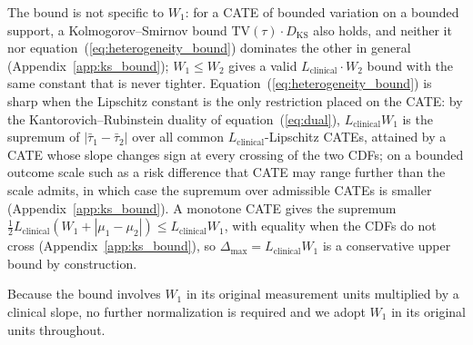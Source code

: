 \documentclass[AMA,Times1COL]{WileyNJDv5}
\begin{document}
The bound is not specific to $W_1$: for a CATE of bounded variation on a bounded support, a Kolmogorov--Smirnov bound $\mathrm{TV}(\tau) \cdot D_{\text{KS}}$ also holds, and neither it nor equation~(\ref{eq:heterogeneity_bound}) dominates the other in general (Appendix~\ref{app:ks_bound}); $W_1 \leq W_2$ gives a valid $L_{\text{clinical}} \cdot W_2$ bound with the same constant that is never tighter. Equation~(\ref{eq:heterogeneity_bound}) is sharp when the Lipschitz constant is the only restriction placed on the CATE: by the Kantorovich--Rubinstein duality of equation~(\ref{eq:dual}), $L_{\text{clinical}} W_1$ is the supremum of $|\bar{\tau}_1 - \bar{\tau}_2|$ over all common $L_{\text{clinical}}$-Lipschitz CATEs, attained by a CATE whose slope changes sign at every crossing of the two CDFs; on a bounded outcome scale such as a risk difference that CATE may range further than the scale admits, in which case the supremum over admissible CATEs is smaller (Appendix~\ref{app:ks_bound}). A monotone CATE gives the supremum $\tfrac{1}{2} L_{\text{clinical}} (W_1 + |\mu_1 - \mu_2|) \leq L_{\text{clinical}} W_1$, with equality when the CDFs do not cross (Appendix~\ref{app:ks_bound}), so $\Delta_{\max} = L_{\text{clinical}} W_1$ is a conservative upper bound by construction.%

Because the bound involves $W_1$ in its original measurement units multiplied by a clinical slope, no further normalization is required and we adopt $W_1$ in its original units throughout.
\end{document}
